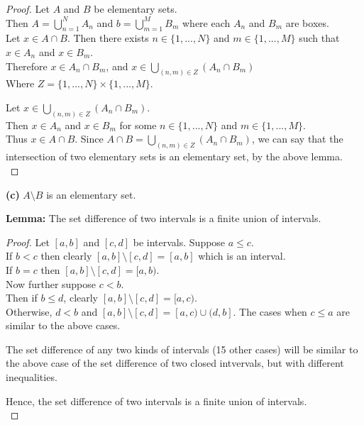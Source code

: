 \documentclass[12pt]{article}
\begin{document}
	\begin{proof}
		Let $A$ and $B$ be elementary sets. \\
		Then $A=\bigcup\limits_{n=1}^{N}A_{n}$ and $b=\bigcup\limits_{m=1}^{M}B_{m}$ where each $A_{n}$ and $B_{m}$ are boxes. \\
		Let $x \in A \cap B$.
		Then there exists $n \in \{1,...,N\}$ and $m \in \{1,...,M\}$ such that $x \in A_{n}$ and $x \in B_{m}$. \\
		Therefore $x \in A_{n} \cap B_{m}$, and $x \in \bigcup\limits_{(n,m) \in Z}(A_{n} \cap B_{m})$ \\
		Where $Z = \{1,...,N\} \times \{1,...,M\}$. \bigbreak
		
		Let $x \in \bigcup\limits_{(n,m) \in Z}(A_{n} \cap B_{m})$. \\
		Then $x \in A_{n}$ and $x \in B_{m}$ for some $n \in \{1,...,N\}$ and $m \in \{1,...,M\}$. \\
		Thus $x \in A \cap B$. \bigbreak
		Since  $A \cap B = \bigcup\limits_{(n,m) \in Z}(A_{n} \cap B_{m})$, we can say that the intersection of two elementary sets is an elementary set, by the above lemma. \\
	\end{proof}

	\hspace{-4 ex}\textbf{(c)} $A \setminus B$ is an elementary set. \bigbreak
	
	\textbf{Lemma:} The set difference of two intervals is a finite union of intervals.
	
	\begin{proof}
		Let $[a,b]$ and $[c,d]$ be intervals. \bigbreak
		Suppose $a \leq c$. \\
		If $ b < c$ then clearly $[a,b] \setminus [c,d] = [a,b]$ which is an interval. \\
		If $b=c$ then $[a,b] \setminus [c,d] = [a,b)$. \\
		Now further suppose $ c < b$. \\
		Then if $b \leq d$, clearly $[a,b] \setminus [c,d] = [a,c)$. \\
		Otherwise, $ d < b$ and $[a,b] \setminus [c,d] = [a,c) \cup (d,b]$. \bigbreak
		The cases when $c \leq a$ are similar to the above cases. \bigbreak
		
		The set difference of any two kinds of intervals (15 other cases) will be similar to the above case of the set difference of two closed intvervals, but with different inequalities. \bigbreak
		
		Hence, the set difference of two intervals is a finite union of intervals. \\
	\end{proof}
\end{document}
